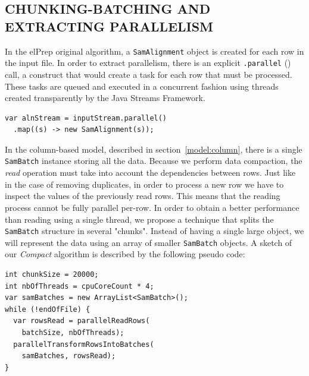 \documentclass[a4paper,twoside]{article}
\begin{document}
\subsection{\uppercase{Chunking-Batching and Extracting Parallelism}} \label{sec:batching}
In the elPrep original algorithm, a {\texttt{SamAlignment} } object is created for each row in the input file.
In order to extract parallelism, there is an explicit {\texttt{.parallel} ()} call, a construct that would create a task for each row that must be processed.
These tasks are queued and executed in a concurrent fashion using threads created transparently by the Java Streams Framework.
\begin{verbatim}
var alnStream = inputStream.parallel()
  .map((s) -> new SamAlignment(s));
\end{verbatim}
In the column-based model, described in section~\ref{model:column}, there is a single {\texttt{SamBatch} } instance storing all the data.
Because we perform data compaction, the {\textit{read} } operation must take into account the dependencies between rows.
Just like in the case of removing duplicates, in order to process a new row we have to inspect the values of the previously read rows.
This means that the reading process cannot be fully parallel per-row.
In order to obtain a better performance than reading using a single thread, we propose a technique that splits the {\texttt{SamBatch} } structure in several "chunks".
Instead of having a single large object, we will represent the data using an array of smaller {\texttt{SamBatch} } objects.
A sketch of our {\textit{Compact} } algorithm is described by the following pseudo code:

\begin{verbatim}
int chunkSize = 20000;
int nbOfThreads = cpuCoreCount * 4;
var samBatches = new ArrayList<SamBatch>();
while (!endOfFile) {
  var rowsRead = parallelReadRows(
    batchSize, nbOfThreads);
  parallelTransformRowsIntoBatches(
    samBatches, rowsRead);
}
\end{verbatim}
\end{document}
